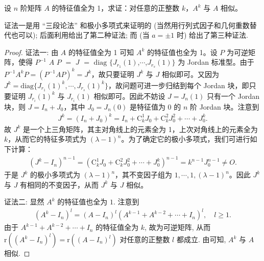 \documentclass[../../main.tex]{subfiles}
\begin{document}
\begin{proposition}\label{example:特征值全为1矩阵的任意幂次于原矩阵相似}
设 \(n\) 阶矩阵 \(A\) 的特征值全为 1，求证：对任意的正整数 \(k\)，\(A^k\) 与 \(A\) 相似。
\end{proposition}
\begin{remark}
{\color{blue}证法一}是用 “三段论法” 和极小多项式来证明的 (当然用行列式因子和几何重数替代也可以); 后面利用给出了第二种证法; 而 (当 $a = \pm 1$ 时) 给出了第三种证法. 
\end{remark}
\begin{proof}
{\color{blue}证法一:}
由 \(A\) 的特征值全为 1 可知 \(A^k\) 的特征值也全为 1。设 \(P\) 为可逆矩阵，使得 $P^{-1}$ $A$ $P$ $=$ $J$ $=$ $\mathrm{diag}$ $\{J_{r_1}(1)$,$\cdots$,$J_{r_s}(1)\}$ 为 Jordan 标准型。由于 \(P^{-1}A^kP=(P^{-1}AP)^k = J^k\)，故只要证明 \(J^k\) 与 \(J\) 相似即可。又因为 \(J^k=\mathrm{diag}\{J_{r_1}(1)^k,\cdots,J_{r_s}(1)^k\}\)，故问题可进一步归结到每个 Jordan 块，即只要证明 \(J_{r_i}(1)^k\) 与 \(J_{r_i}(1)\) 相似即可。因此不妨设 \(J = J_n(1)\) 只有一个 Jordan 块，则 \(J = I_n+J_0\)，其中 \(J_0 = J_n(0)\) 是特征值为 0 的 \(n\) 阶 Jordan 块。注意到
\begin{align*}
J^k=(I_n + J_0)^k
=I_n + \mathrm{C}_k^1J_0 + \mathrm{C}_k^2J_0^2+\cdots+J_0^k.
\end{align*}
故 \(J^k\) 是一个上三角矩阵，其主对角线上的元素全为 1，上次对角线上的元素全为 \(k\)，从而它的特征多项式为 \((\lambda - 1)^n\)。为了确定它的极小多项式，我们可进行如下计算：
\begin{align*}
(J^k - I_n)^{n - 1}=(\mathrm{C}_k^1J_0 + \mathrm{C}_k^2J_0^2+\cdots+J_0^k)^{n - 1}
=k^{n - 1}J_0^{n - 1}\neq O.
\end{align*}
于是 \(J^k\) 的极小多项式为 \((\lambda - 1)^n\)，其不变因子组为 \(1,\cdots,1,(\lambda - 1)^n\)。因此 \(J^k\) 与 \(J\) 有相同的不变因子，从而 \(J^k\) 与 \(J\) 相似。

{\color{blue}证法二:}
显然 $A^k$ 的特征值也全为 $1$. 注意到
\begin{align*}
(A^k - I_n)^l = (A - I_n)^l(A^{k - 1} + A^{k - 2} + \cdots + I_n)^l, \quad l \geq 1.
\end{align*}
由于 $A^{k - 1} + A^{k - 2} + \cdots + I_n$ 的特征值全为 $k$, 故为可逆矩阵, 从而 $\mathrm{r}((A^k - I_n)^l) = \mathrm{r}((A - I_n)^l)$ 对任意的正整数 $l$ 都成立. 由可知, $A^k$ 与 $A$ 相似. 
\end{proof}
\end{document}
